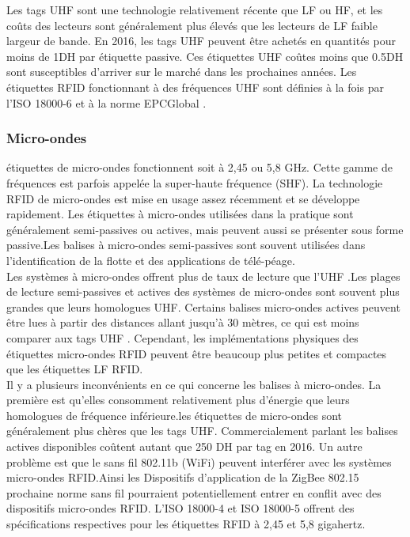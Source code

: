 \documentclass[11pt, a4paper, twoside]{book}
\begin{document}
Les tags UHF sont une technologie relativement récente que LF ou HF, et les coûts des lecteurs sont généralement plus élevés que les lecteurs de LF faible largeur de bande. En 2016, les tags UHF peuvent être achetés en quantités pour moins de 1DH par étiquette passive. Ces étiquettes UHF coûtes moins que  0.5DH sont susceptibles d'arriver sur le marché dans les prochaines années. Les étiquettes RFID fonctionnant à des fréquences UHF sont définies à la fois par l'ISO 18000-6 et à la norme EPCGlobal .
\subsubsection{Micro-ondes} 
étiquettes de micro-ondes fonctionnent soit à 2,45 ou 5,8 GHz. Cette gamme de fréquences est parfois appelée la super-haute fréquence (SHF). La technologie RFID de micro-ondes est mise en usage assez récemment et se développe rapidement. Les étiquettes à micro-ondes utilisées dans la pratique sont généralement semi-passives ou actives, mais peuvent aussi se présenter sous forme passive.Les balises à micro-ondes semi-passives sont souvent utilisées dans l'identification de la flotte et des applications de télé-péage.\\


Les systèmes à micro-ondes offrent plus de taux de lecture que l'UHF .Les plages de lecture semi-passives et actives des systèmes de micro-ondes sont souvent plus grandes que leurs homologues UHF. Certains balises micro-ondes actives peuvent être lues à partir des distances allant jusqu'à 30 mètres, ce qui est moins comparer aux tags UHF . Cependant, les implémentations physiques des étiquettes micro-ondes  RFID peuvent être beaucoup plus petites et compactes que les étiquettes LF  RFID.\\


Il y a plusieurs inconvénients en ce qui concerne les balises à micro-ondes. La première est qu'elles consomment relativement plus d'énergie que leurs homologues de fréquence inférieure.les étiquettes de micro-ondes sont généralement plus chères que les tags UHF. Commercialement parlant les balises actives disponibles coûtent autant que 250 DH par tag en 2016.
Un autre problème est que le sans fil 802.11b (WiFi) peuvent interférer avec les systèmes micro-ondes RFID.Ainsi les Dispositifs d'application de la ZigBee 802.15 prochaine norme sans fil pourraient potentiellement entrer en conflit avec des dispositifs micro-ondes RFID.
L'ISO 18000-4 et ISO 18000-5 offrent des spécifications respectives pour les étiquettes RFID à 2,45 et 5,8 gigahertz. 
\end{document}

